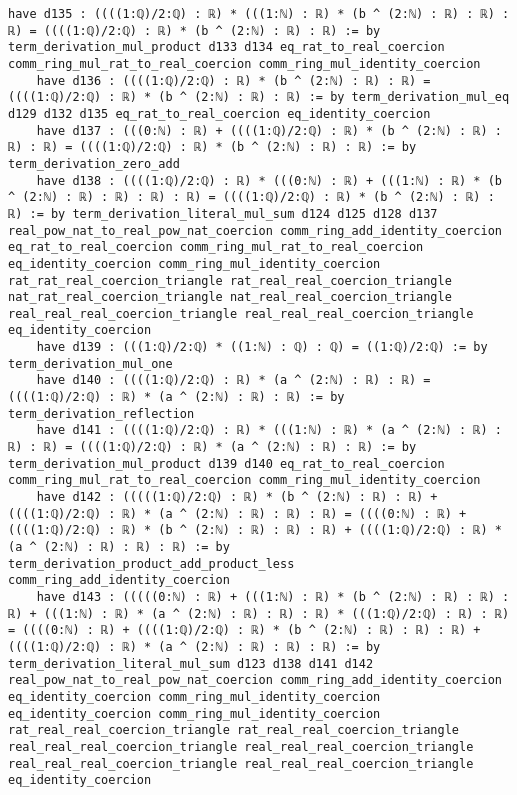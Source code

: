 \documentclass{article}
\begin{document}
\begin{tcolorbox}[colback=white!10, width=\linewidth]
\begin{lstlisting}[language=Lean4]
    have d135 : ((((1:ℚ)/2:ℚ) : ℝ) * (((1:ℕ) : ℝ) * (b ^ (2:ℕ) : ℝ) : ℝ) : ℝ) = ((((1:ℚ)/2:ℚ) : ℝ) * (b ^ (2:ℕ) : ℝ) : ℝ) := by term_derivation_mul_product d133 d134 eq_rat_to_real_coercion comm_ring_mul_rat_to_real_coercion comm_ring_mul_identity_coercion
    have d136 : ((((1:ℚ)/2:ℚ) : ℝ) * (b ^ (2:ℕ) : ℝ) : ℝ) = ((((1:ℚ)/2:ℚ) : ℝ) * (b ^ (2:ℕ) : ℝ) : ℝ) := by term_derivation_mul_eq d129 d132 d135 eq_rat_to_real_coercion eq_identity_coercion
    have d137 : (((0:ℕ) : ℝ) + ((((1:ℚ)/2:ℚ) : ℝ) * (b ^ (2:ℕ) : ℝ) : ℝ) : ℝ) = ((((1:ℚ)/2:ℚ) : ℝ) * (b ^ (2:ℕ) : ℝ) : ℝ) := by term_derivation_zero_add
    have d138 : ((((1:ℚ)/2:ℚ) : ℝ) * (((0:ℕ) : ℝ) + (((1:ℕ) : ℝ) * (b ^ (2:ℕ) : ℝ) : ℝ) : ℝ) : ℝ) = ((((1:ℚ)/2:ℚ) : ℝ) * (b ^ (2:ℕ) : ℝ) : ℝ) := by term_derivation_literal_mul_sum d124 d125 d128 d137 real_pow_nat_to_real_pow_nat_coercion comm_ring_add_identity_coercion eq_rat_to_real_coercion comm_ring_mul_rat_to_real_coercion eq_identity_coercion comm_ring_mul_identity_coercion rat_rat_real_coercion_triangle rat_real_real_coercion_triangle nat_rat_real_coercion_triangle nat_real_real_coercion_triangle real_real_real_coercion_triangle real_real_real_coercion_triangle eq_identity_coercion
    have d139 : (((1:ℚ)/2:ℚ) * ((1:ℕ) : ℚ) : ℚ) = ((1:ℚ)/2:ℚ) := by term_derivation_mul_one
    have d140 : ((((1:ℚ)/2:ℚ) : ℝ) * (a ^ (2:ℕ) : ℝ) : ℝ) = ((((1:ℚ)/2:ℚ) : ℝ) * (a ^ (2:ℕ) : ℝ) : ℝ) := by term_derivation_reflection
    have d141 : ((((1:ℚ)/2:ℚ) : ℝ) * (((1:ℕ) : ℝ) * (a ^ (2:ℕ) : ℝ) : ℝ) : ℝ) = ((((1:ℚ)/2:ℚ) : ℝ) * (a ^ (2:ℕ) : ℝ) : ℝ) := by term_derivation_mul_product d139 d140 eq_rat_to_real_coercion comm_ring_mul_rat_to_real_coercion comm_ring_mul_identity_coercion
    have d142 : (((((1:ℚ)/2:ℚ) : ℝ) * (b ^ (2:ℕ) : ℝ) : ℝ) + ((((1:ℚ)/2:ℚ) : ℝ) * (a ^ (2:ℕ) : ℝ) : ℝ) : ℝ) = ((((0:ℕ) : ℝ) + ((((1:ℚ)/2:ℚ) : ℝ) * (b ^ (2:ℕ) : ℝ) : ℝ) : ℝ) + ((((1:ℚ)/2:ℚ) : ℝ) * (a ^ (2:ℕ) : ℝ) : ℝ) : ℝ) := by term_derivation_product_add_product_less comm_ring_add_identity_coercion
    have d143 : (((((0:ℕ) : ℝ) + (((1:ℕ) : ℝ) * (b ^ (2:ℕ) : ℝ) : ℝ) : ℝ) + (((1:ℕ) : ℝ) * (a ^ (2:ℕ) : ℝ) : ℝ) : ℝ) * (((1:ℚ)/2:ℚ) : ℝ) : ℝ) = ((((0:ℕ) : ℝ) + ((((1:ℚ)/2:ℚ) : ℝ) * (b ^ (2:ℕ) : ℝ) : ℝ) : ℝ) + ((((1:ℚ)/2:ℚ) : ℝ) * (a ^ (2:ℕ) : ℝ) : ℝ) : ℝ) := by term_derivation_literal_mul_sum d123 d138 d141 d142 real_pow_nat_to_real_pow_nat_coercion comm_ring_add_identity_coercion eq_identity_coercion comm_ring_mul_identity_coercion eq_identity_coercion comm_ring_mul_identity_coercion rat_real_real_coercion_triangle rat_real_real_coercion_triangle real_real_real_coercion_triangle real_real_real_coercion_triangle real_real_real_coercion_triangle real_real_real_coercion_triangle eq_identity_coercion

\end{lstlisting}
\end{tcolorbox}
\end{document}
